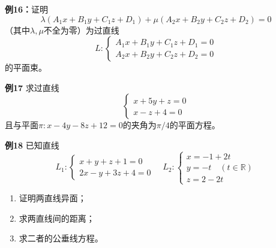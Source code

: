 \begin{frame}
	\linespread{1.2}
	\begin{exampleblock}{{\bf 例16：}证明\hfill}
		$$\lambda(A_1x+B_1y+C_1z+D_1)+\mu(A_2x+B_2y+C_2z+D_2)=0$$
		（其中$\lambda,\mu$不全为零）为过直线
		$$L:\left\{\begin{array}{l}
			A_1x+B_1y+C_1z+D_1=0\\
			A_2x+B_2y+C_2z+D_2=0
		\end{array}\right.$$
		的{\bb 平面束}。
	\end{exampleblock}
\end{frame}

\begin{frame}
	\linespread{1.2}
	\begin{exampleblock}{{\bf 例17}\hfill}
		求过直线
		$$\left\{\begin{array}{l}
			x+5y+z=0\\
			x-z+4=0
		\end{array}\right.$$
		且与平面$\pi:x-4y-8z+12=0$的夹角为$\pi/4$的平面方程。
	\end{exampleblock}
\end{frame}

\begin{frame}
	\linespread{1.2}
	\begin{exampleblock}{{\bf 例18}\hfill}
		已知直线
		$$L_1:\left\{\begin{array}{l}
			x+y+z+1=0\\
			2x-y+3z+4=0
		\end{array}\right.
		\quad
		L_2:\left\{\begin{array}{l}
			x=-1+2t\\
			y=-t\quad(t\in\mathbb{R})\\
			z=2-2t
		\end{array}\right.
		$$
		\begin{enumerate}
		  \item 证明两直线异面；
		  \item 求两直线间的距离；
		  \item 求二者的公垂线方程。
		\end{enumerate}
	\end{exampleblock}
\end{frame}





